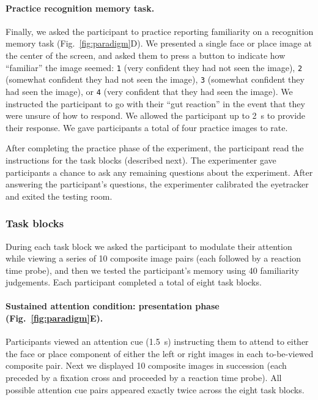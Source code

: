 \documentclass[english]{article}
\begin{document}
\paragraph{Practice recognition memory task.}

Finally, we asked the participant to practice reporting familiarity on a
recognition memory task (Fig.~\ref{fig:paradigm}D). We presented a single face
or place image at the center of the screen, and asked them to press a button to
indicate how ``familiar'' the image seemed: \texttt{1} (very confident they had
not seen the image), \texttt{2} (somewhat confident they had not seen the
image), \texttt{3} (somewhat confident they had seen the image), or \texttt{4}
(very confident that they had seen the image). We instructed the participant to
go with their ``gut reaction'' in the event that they were unsure of how to
respond. We allowed the participant up to 2~s to provide their response. We
gave participants a total of four practice images to rate.

After completing the practice phase of the experiment, the participant read the
instructions for the task blocks (described next). The experimenter gave
participants a chance to ask any remaining questions about the experiment.
After answering the participant's questions, the experimenter calibrated the
eyetracker and exited the testing room.

\subsubsection*{Task blocks}

During each task block we asked the participant to modulate their attention
while viewing a series of 10 composite image pairs (each followed by a reaction
time probe), and then we tested the participant's memory using 40 familiarity
judgements. Each participant completed a total of eight task blocks.

\paragraph*{Sustained attention condition: presentation phase
(Fig.~\ref{fig:paradigm}E).}

Participants viewed an attention cue (1.5~s) instructing them to attend to
either the face or place component of either the left or right images in each
to-be-viewed composite pair. Next we displayed 10 composite images in
succession (each preceded by a fixation cross and proceeded by a reaction time
probe). All possible attention cue pairs appeared exactly twice across the
eight task blocks.
\end{document}
